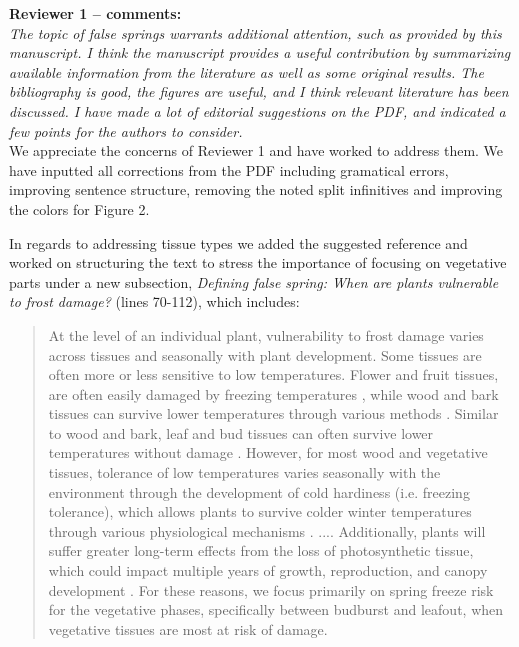 \documentclass[11pt,a4paper]{article}
\begin{document}


\textbf {Reviewer 1 -- comments:} \\

\textit{The topic of false springs warrants additional attention, such as provided by this manuscript. I think the manuscript provides a useful contribution by summarizing available information from the literature as well as some original results. The bibliography is good, the figures are useful, and I think relevant literature has been discussed. I have made a lot of editorial suggestions on the PDF, and indicated a few points for the authors to consider.}\\


We appreciate the concerns of Reviewer 1 and have worked to address them. We have inputted all corrections from the PDF including gramatical errors, improving sentence structure, removing the noted split infinitives and improving the colors for Figure 2. 

In regards to addressing tissue types we added the suggested reference and worked on structuring the text to stress the importance of focusing on vegetative parts under a new subsection, \textit{Defining false spring: When are plants vulnerable to frost damage?} (lines 70-112), which includes:

\begin{quotation}
At the level of an individual plant, vulnerability to frost damage varies across tissues and seasonally with plant development. Some tissues are often more or less sensitive to low temperatures. Flower and fruit tissues, are often easily damaged by freezing temperatures \citep{Augspurger2009, Caradonna2016, Inouye2000, Lenz2013}, while wood and bark tissues can survive lower temperatures through various methods \citep{Strimbeck2015}. Similar to wood and bark, leaf and bud tissues can often survive lower temperatures without damage \citep{Charrier2011}. However, for most wood and vegetative tissues, tolerance of low temperatures varies seasonally with the environment through the development of cold hardiness (i.e. freezing tolerance), which allows plants to survive colder winter temperatures through various physiological mechanisms \citep[] [e.g., deep supercooling, increased solute concentration, and an increase in dehydrins and other proteins] {Sakai1987, Strimbeck2015}. 
....
Additionally, plants will suffer greater long-term effects from the loss of photosynthetic tissue, which could impact multiple years of growth, reproduction, and canopy development \citep{Vitasse2014, Xie2015}.  For these reasons, we focus primarily on spring freeze risk for the vegetative phases, specifically between budburst and leafout, when vegetative tissues are most at risk of damage.
\end{quotation}
\end{document}

